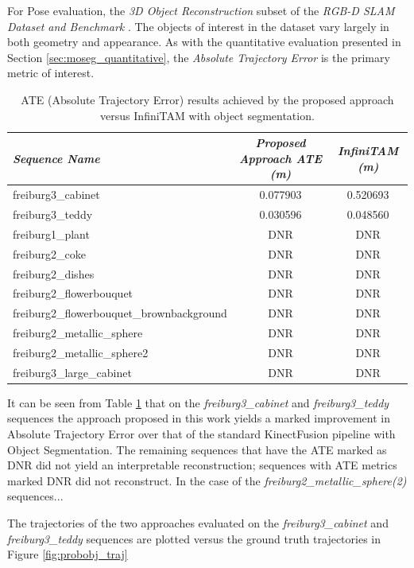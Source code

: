 For Pose evaluation, the \textit{3D Object Reconstruction} subset of the 
\textit{RGB-D SLAM Dataset and Benchmark} \cite{Sturm2012}. The objects of interest in 
the dataset vary largely in both geometry and appearance. As with the quantitative 
evaluation presented in Section \ref{sec:moseg_quantitative}, the 
\textit{Absolute Trajectory Error} is the primary metric of interest.

\begin{table}[ht]
  \label{tbl:probobj_ate}
  \centering
  \begin{tabular}{l@{\hskip 1cm} c c}
    \emph{Sequence Name} & \emph{Proposed Approach ATE (m)} & \emph{InfiniTAM (m)}\\
    \midrule
    \textsf{freiburg3\_cabinet} & 0.077903 & 0.520693\\
    \textsf{freiburg3\_teddy}   & 0.030596 & 0.048560 \\
    \textsf{freiburg1\_plant}   & DNR & DNR \\
    \textsf{freiburg2\_coke}   & DNR & DNR \\
    \textsf{freiburg2\_dishes}   & DNR & DNR \\
    \textsf{freiburg2\_flowerbouquet}   & DNR & DNR \\
    \textsf{freiburg2\_flowerbouquet\_brownbackground}   & DNR & DNR \\
    \textsf{freiburg2\_metallic\_sphere}   & DNR & DNR \\
    \textsf{freiburg2\_metallic\_sphere2}   & DNR & DNR \\
    \textsf{freiburg3\_large\_cabinet}   & DNR & DNR
  \end{tabular}
  \caption{ATE (Absolute Trajectory Error) results achieved by the proposed approach versus 
  InfiniTAM with object segmentation.
  }
\end{table}

It can be seen from Table \ref{tbl:probobj_ate} that on the \textit{freiburg3\_cabinet} 
and \textit{\textsf{freiburg3\_teddy}} sequences the approach proposed in this work 
yields a marked improvement in Absolute Trajectory Error over that of the standard KinectFusion 
pipeline with Object Segmentation. The remaining sequences that have the ATE marked as DNR did 
not yield an interpretable reconstruction; sequences with ATE metrics marked DNR did not 
reconstruct. In the case of the \textit{freiburg2\_metallic\_sphere(2)} sequences...

The trajectories of the two approaches evaluated on the \textit{freiburg3\_cabinet} 
and \textit{\textsf{freiburg3\_teddy}} sequences are plotted versus the ground truth trajectories 
in Figure \ref{fig:probobj_traj}

